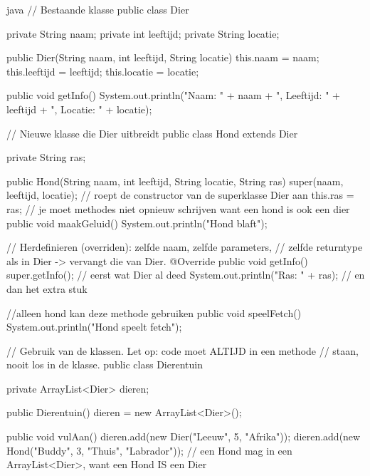 \documentclass[a4paper,11pt]{article}
\begin{document}
\begin{codeblock}{java}
    // Bestaande klasse
    public class Dier
        {

            private String naam;
            private int leeftijd;
            private String locatie;

            public Dier(String naam, int leeftijd, String locatie) {
                    this.naam = naam;
                    this.leeftijd = leeftijd;
                    this.locatie = locatie;
                }

            public void getInfo() {
                    System.out.println("Naam: " + naam + ", Leeftijd: " + leeftijd + ", Locatie: " + locatie);
                }
        }

    // Nieuwe klasse die Dier uitbreidt
    public class Hond extends Dier
        {

            private String ras;

            public Hond(String naam, int leeftijd, String locatie, String ras) {
                    super(naam, leeftijd, locatie); // roept de constructor van de superklasse Dier aan
                    this.ras = ras;
                }
            // je moet methodes niet opnieuw schrijven want een hond is ook een dier
            public void maakGeluid() {
                    System.out.println("Hond blaft");
                }

            // Herdefinieren (overriden): zelfde naam, zelfde parameters,
            // zelfde returntype als in Dier -> vervangt die van Dier.
            @Override
            public void getInfo() {
                    super.getInfo();          // eerst wat Dier al deed
                    System.out.println("Ras: " + ras);  // en dan het extra stuk
                }

            //alleen hond kan deze methode gebruiken
            public void speelFetch() {
                    System.out.println("Hond speelt fetch");
                }
        }

    // Gebruik van de klassen. Let op: code moet ALTIJD in een methode
    // staan, nooit los in de klasse.
    public class Dierentuin
        {
            private ArrayList<Dier> dieren;

            public Dierentuin() {
                    dieren = new ArrayList<Dier>();
                }

            public void vulAan() {
                    dieren.add(new Dier("Leeuw", 5, "Afrika"));
                    dieren.add(new Hond("Buddy", 3, "Thuis", "Labrador"));
                    // een Hond mag in een ArrayList<Dier>, want een Hond IS een Dier
                }

}
\end{codeblock}
\end{document}
